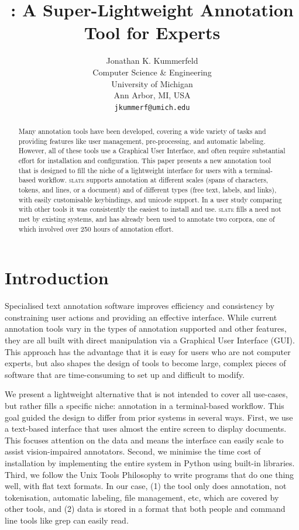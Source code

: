 \documentclass[11pt,a4paper]{article}
\title{\slate: A Super-Lightweight Annotation Tool for Experts}
\author{
  Jonathan K. Kummerfeld \\
  Computer Science \& Engineering \\
  University of Michigan \\
  Ann Arbor, MI, USA \\
  {\tt jkummerf@umich.edu}
}
\date{}
\newcommand\Slate{\textsc{slate}\xspace}
\begin{document}
\maketitle

\begin{abstract}

  Many annotation tools have been developed, covering a wide variety of tasks and providing features like user management, pre-processing, and automatic labeling.
  However, all of these tools use a Graphical User Interface, and often require substantial effort for installation and configuration.
  This paper presents a new annotation tool that is designed to fill the niche of a lightweight interface for users with a terminal-based workflow.
  \Slate supports annotation at different scales (spans of characters, tokens, and lines, or a document) and of different types (free text, labels, and links), with easily customisable keybindings, and unicode support.
  In a user study comparing with other tools it was consistently the easiest to install and use.
  \Slate fills a need not met by existing systems, and has already been used to annotate two corpora, one of which involved over 250 hours of annotation effort.

\end{abstract}

\section{Introduction}

Specialised text annotation software improves efficiency and consistency by constraining user actions and providing an effective interface.
While current annotation tools vary in the types of annotation supported and other features, they are all built with direct manipulation via a Graphical User Interface (GUI).
This approach has the advantage that it is easy for users who are not computer experts, but also shapes the design of tools to become large, complex pieces of software that are time-consuming to set up and difficult to modify.

We present a lightweight alternative that is not intended to cover all use-cases, but rather fills a specific niche: annotation in a terminal-based workflow.
This goal guided the design to differ from prior systems in several ways.
First, we use a text-based interface that uses almost the entire screen to display documents.
This focuses attention on the data and means the interface can easily scale to assist vision-impaired annotators.
Second, we minimise the time cost of installation by implementing the entire system in Python using built-in libraries.
Third, we follow the Unix Tools Philosophy \citep{unix} to write programs that do one thing well, with flat text formats.
In our case,
(1) the tool only does annotation, not tokenisation, automatic labeling, file management, etc, which are covered by other tools, and
(2) data is stored in a format that both people and command line tools like grep can easily read.
\end{document}
